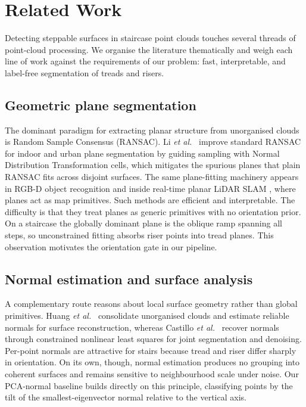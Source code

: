 \section{Related Work}
\label{sec:related}

Detecting steppable surfaces in staircase point clouds touches several
threads of point-cloud processing. We organise the literature thematically
and weigh each line of work against the requirements of our problem:
fast, interpretable, and label-free segmentation of treads and risers.

\subsection{Geometric plane segmentation}
The dominant paradigm for extracting planar structure from unorganised
clouds is Random Sample Consensus (RANSAC). Li \emph{et al.}\
\cite{li2017improved} improve standard RANSAC for indoor and urban plane
segmentation by guiding sampling with Normal Distribution Transformation
cells, which mitigates the spurious planes that plain RANSAC fits across
disjoint surfaces. The same plane-fitting machinery appears in RGB-D
object recognition \cite{jalal2021rgb} and inside real-time planar LiDAR
SLAM \cite{zhou2021lsam}, where planes act as map primitives. Such
methods are efficient and interpretable. The difficulty is that they
treat planes as generic primitives with no orientation prior. On a
staircase the globally dominant plane is the oblique ramp spanning all
steps, so unconstrained fitting absorbs riser points into tread planes.
This observation motivates the orientation gate in our pipeline.

\subsection{Normal estimation and surface analysis}
A complementary route reasons about local surface geometry rather than
global primitives. Huang \emph{et al.}\ \cite{huang2009consolidation}
consolidate unorganised clouds and estimate reliable normals for surface
reconstruction, whereas Castillo \emph{et al.}\ \cite{castillo2013point}
recover normals through constrained nonlinear least squares for joint
segmentation and denoising. Per-point normals are attractive for stairs
because tread and riser differ sharply in orientation. On its own,
though, normal estimation produces no grouping into coherent surfaces and
remains sensitive to neighbourhood scale under noise. Our PCA-normal
baseline builds directly on this principle, classifying points by the
tilt of the smallest-eigenvector normal relative to the vertical axis.

